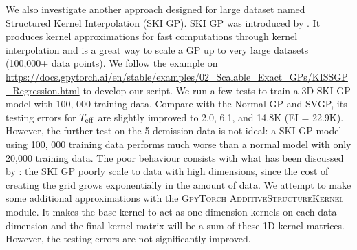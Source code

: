 We also investigate another approach designed for large dataset named Structured Kernel Interpolation (SKI GP). SKI GP was introduced by \citet{wilson2015kernel}. It produces kernel approximations for fast computations through kernel interpolation and is a great way to scale a GP up to very large datasets (100,000+ data points).
We follow the example on \url{https://docs.gpytorch.ai/en/stable/examples/02_Scalable_Exact_GPs/KISSGP_Regression.html} to develop our script. 
We run a few tests to train a 3D SKI GP model with 100, 000 training data. Compare with the Normal GP and SVGP, its testing errors for $T_{\rm eff}$ are slightly improved to 2.0, 6.1, and 14.8K (EI = 22.9K). However, the further test on the 5-demission data is not ideal: a SKI GP model using 100, 000 training data performs much worse than a normal model with only 20,000 training data. The poor behaviour consists with what has been discussed by \citet{wilson2015kernel}: the SKI GP poorly scale to data with high dimensions, since the cost of creating the grid grows exponentially in the amount of data. We attempt to make some additional approximations with the \textsc{GpyTorch AdditiveStructureKernel} module. It makes the base kernel to act as one-dimension kernels on each data dimension and the final kernel matrix will be a sum of these 1D kernel matrices. However, the testing errors are not significantly improved. 






